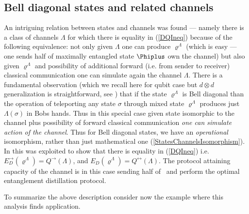 \documentclass[twocolumn,aps,rmp]{revtex4}
\begin{document}
\subsection{Bell diagonal states  and related channels}
An intriguing relation  between states and channels was found
\cite{BDSW1996} --- namely there is a class of channels $\Lambda$ for
which there is equality in (\ref{DQIneq}) because of the following
equivalence: not only given $\Lambda$ one can produce
$\varrho^{\Lambda}$ (which is easy --- one sends half of maximally
entangled state  $\Phiplus$ own the channel) but also given
$\varrho^{\Lambda}$ and possibility of additional forward
(i.e. from sender to receiver) classical communication  one can
simulate again the channel $\Lambda$. There is a fundamental
observation \cite{BDSW1996}(which we recall here for qubit case but
$d \otimes d$ generalization is straightforward, see \cite{gentele})
that if the state $\varrho^{\Lambda}$ is Bell diagonal than the
operation of teleporting any state $\sigma$ through mixed state
$\varrho^{\Lambda}$ produces just $\Lambda(\sigma)$ in Bobs hands.
Thus in this special case given state isomorphic to the channel plus
possibility of forward classical communication {\it one can simulate
action of the channel}. Thus for Bell diagonal states, we have an
{\it operational} isomorphism, rather than just mathematical one
(\ref{StatesChannelsIsomorphism}). In  \cite{BDSW1996} this was
exploited to show that there is equality in (\ref{DQIneq}) i.e.
$E_{D}^{\rightarrow}(\varrho^{\Lambda})=Q^{\rightarrow}(\Lambda)$,
and $E_D(\varrho^\Lambda)=Q^\leftrightarrow(\Lambda)$. The protocol attaining
capacity of the channel is in this case sending half of \singlet\
and perform the optimal entanglement distillation protocol.

To summarize the above description consider now the example where
this analysis finds application.
\end{document}
